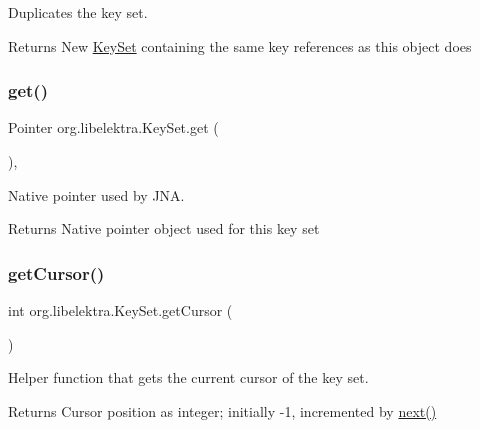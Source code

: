 Duplicates the key set. 

\begin{DoxyReturn}{Returns}
New \hyperlink{classorg_1_1libelektra_1_1KeySet}{Key\+Set} containing the same key references as this object does 
\end{DoxyReturn}
\mbox{\label{classorg_1_1libelektra_1_1KeySet_abf3f028c9c3b88a47aa9d67a5c8e95da}} 
\subsubsection{\texorpdfstring{get()}{get()}}
{\footnotesize\ttfamily Pointer org.\+libelektra.\+Key\+Set.\+get (\begin{DoxyParamCaption}{ }\end{DoxyParamCaption})\hspace{0.3cm}{\ttfamily [inline]}, {\ttfamily [protected]}}



Native pointer used by J\+NA. 

\begin{DoxyReturn}{Returns}
Native pointer object used for this key set 
\end{DoxyReturn}
\mbox{\label{classorg_1_1libelektra_1_1KeySet_a37e6d574b4595021a6cc732e325219e1}} 
\subsubsection{\texorpdfstring{get\+Cursor()}{getCursor()}}
{\footnotesize\ttfamily int org.\+libelektra.\+Key\+Set.\+get\+Cursor (\begin{DoxyParamCaption}{ }\end{DoxyParamCaption})\hspace{0.3cm}{\ttfamily [inline]}}



Helper function that gets the current cursor of the key set. 

\begin{DoxyReturn}{Returns}
Cursor position as integer; initially -\/1, incremented by \hyperlink{classorg_1_1libelektra_1_1KeySet_a92aa593320132e4272602dda29aee2c7}{next()} 
\end{DoxyReturn}
\mbox{\label{classorg_1_1libelektra_1_1KeySet_a11ba1ef1213a9f1ac5743491bc7154e5}} 
